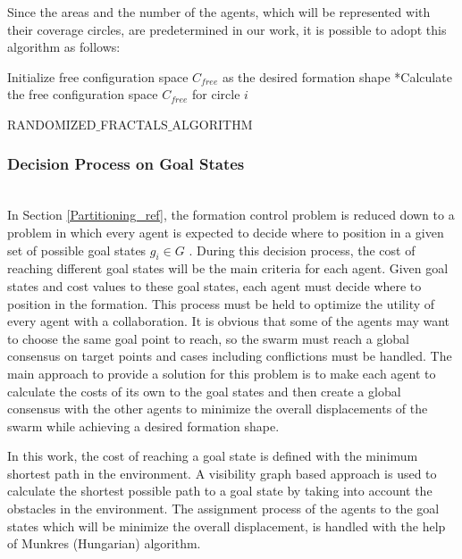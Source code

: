Since the areas and the number of the agents, which will be represented with their coverage circles, are predetermined in our work, it is possible to adopt this algorithm as follows:
		
\begin{algorithm}[H]
Initialize free configuration space $C_{free}$ as the desired formation shape \newline
{}
{		
*Calculate the free configuration space $C_{free}$ for circle $i$\;
}\												
\caption{RANDOMIZED$\_$FRACTALS$\_$ALGORITHM} 
\end{algorithm}
		

	
\subsubsection{Decision Process on Goal States}\hspace{0pt} \label{DecisionProcess Ref} \\
In Section \ref{Partitioning_ref}, the formation control problem is reduced down to a problem in which every agent is expected to decide where to position in a given set of possible goal states $g_i \in G$ .  During this decision process, the cost of reaching different goal states will be the main criteria for each agent. Given goal states and cost values to these goal states, each agent must decide where to position in the formation. This process must be held to optimize the utility of every agent with a collaboration. It is obvious that some of the agents may want to choose the same goal point to reach, so the swarm must reach a global consensus on target points and cases including conflictions must be handled. The main approach to provide a solution for this problem is to make each agent to calculate the costs of its own to the goal states and then create a global consensus with the other agents to minimize the overall displacements of the swarm while achieving a desired formation shape. 

In this work, the cost of reaching a goal state is defined with the minimum shortest path in the environment. A visibility graph based approach is used to calculate the shortest possible path to a goal state by taking into account the obstacles in the environment. The assignment process of the agents to the goal states which will be minimize the overall displacement, is handled with the help of Munkres (Hungarian)  algorithm.
	
